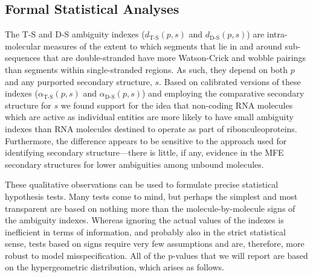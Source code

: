 \documentclass[10pt,letterpaper]{article}
\begin{document}
\subsection*{Formal Statistical Analyses}
The T-S and D-S ambiguity indexes ($d_\text{T-S}(p,s)$ and $d_\text{D-S}(p,s)$)  are intra-molecular measures of the extent to which segments that lie in and around sub-sequences that are double-stranded have more Watson-Crick and wobble pairings than
segments within single-stranded regions. As such, they depend on both $p$ and any purported secondary structure, $s$. Based on calibrated versions of these indexes ($\alpha_\text{T-S}(p,s)$ and $\alpha_\text{D-S}(p,s)$) and employing the comparative secondary structure for $s$ we found support for the idea that non-coding RNA molecules which are active as individual entities are more likely to have small ambiguity indexes than RNA molecules destined to operate as part of ribonculeoproteins. Furthermore, the difference appears to be sensitive to the approach used for identifying secondary structure---there is little, if any, evidence in the MFE secondary structures for lower ambiguities among unbound molecules.

These qualitative observations can be used to formulate precise statistical hypothesis tests.  Many tests come to mind, but perhaps the simplest and most transparent are based on nothing more than the molecule-by-molecule signs of the ambiguity indexes. Whereas ignoring the actual values of the indexes is inefficient in terms of information, and probably also in the strict statistical sense, tests based on signs require very few assumptions and are, therefore, more robust to model misspecification. All of the p-values that we will report are based on the hypergeometric distribution, which arises as follows.
\end{document}
